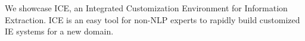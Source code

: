 We showcase ICE, an Integrated Customization Environment for Information Extraction. ICE is an easy tool for non-NLP experts to rapidly build customized IE systems for a new domain.

